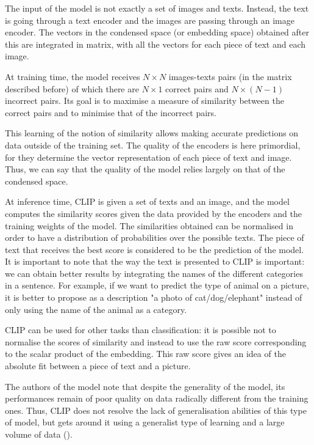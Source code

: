 \documentclass{article}
\begin{document}
\begin{appendix}
\begin{multicols}{2}
The input of the model is not exactly a set of images and texts. Instead, the text is going through a text encoder and the images are passing through an image encoder. The vectors in the condensed space (or embedding space) obtained after this are integrated in matrix, with all the vectors for each piece of text and each image.

At training time, the model receives $N \times N$ images-texts pairs (in the matrix described before) of which there are $N \times 1$ correct pairs and $N\times(N-1)$ incorrect pairs. Its goal is to maximise a measure of similarity between the correct pairs and to minimise that of the incorrect pairs. 

This learning of the notion of similarity allows making accurate predictions on data outside of the training set. The quality of the encoders is here primordial, for they determine the vector representation of each piece of text and image. Thus, we can say that the quality of the model relies largely on that of the condensed space. 

At inference time, CLIP is given a set of texts and an image, and the model computes the similarity scores given the data provided by the encoders and the training weights of the model. The similarities obtained can be normalised in order to have a distribution of probabilities over the possible texts. The piece of text that receives the best score is considered to be the prediction of the model. It is important to note that the way the text is presented to CLIP is important: we can obtain better results by integrating the names of the different categories in a sentence. For example, if we want to predict the type of animal on a picture, it is better to propose as a description "a photo of cat/dog/elephant" instead of only using the name of the animal as a category. 

CLIP can be used for other tasks than classification: it is possible not to normalise the scores of similarity and instead to use the raw score corresponding to the scalar product of the embedding. This raw score gives an idea of the absolute fit between a piece of text and a picture. 

The authors of the model note that despite the generality of the model, its performances remain of poor quality on data radically different from the training ones. Thus, CLIP does not resolve the lack of generalisation abilities of this type of model, but gets around it using a generalist type of learning and a large volume of data (\cite{openaiclip, learntransf}). 
\end{multicols}


\end{appendix}
\end{document}

